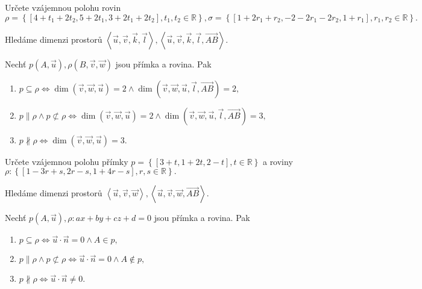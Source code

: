\begin{priklad}
Určete vzájemnou polohu rovin $\rho = \left \{ [4+t_1+2t_2,5+2t_1,3+2t_1+2t_2],t_1,t_2\in \mathbb R \right \} ,
\sigma = \left \{ [1+2r_1+r_2,-2-2r_1-2r_2,1+r_1],r_1,r_2\in \mathbb R \right \}. $
\end{priklad}

\begin{reseni}
Hledáme dimenzi prostorů $\left < \vec u, \vec v, \vec k, \vec l \right >, \left < \vec u, \vec v, \vec k, \vec l, \overrightarrow{AB} \right > .$
\end{reseni}

\begin{veta}
    Nechť $p(A,\vec u), \rho(B,\vec v, \vec w)$ jsou přímka a rovina. Pak
    \begin{enumerate}[$i.$]
    \item $p\subseteq \rho \iff \dim (\vec v, \vec w, \vec u) = 2 \land \dim (\vec v, \vec w, \vec u, \vec l, \overrightarrow{AB})=2,$
   	\item $p \parallel \rho \land p \not\subset \rho \iff \dim (\vec v, \vec w, \vec u) = 2 \land \dim (\vec v, \vec w, \vec u, \vec l, \overrightarrow{AB})=3,$
   	\item $p \nparallel \rho \iff \dim (\vec v, \vec w, \vec u) = 3$.
    \end{enumerate}
\end{veta}

\begin{priklad}
Určete vzájemnou polohu přímky $p=\left \{ [3+t,1+2t,2-t],t \in \mathbb R \right \} $
a roviny $\rho:\left \{ [1-3r+s,2r-s,1+4r-s],r,s\in \mathbb R \right \} .$
\end{priklad}

\begin{reseni}
Hledáme dimenzi prostorů $\left < \vec u, \vec v, \vec w \right >, \left < \vec u, \vec v, \vec w,  \overrightarrow{AB} \right > .$
\end{reseni}

\begin{veta}
    Nechť $p(A,\vec u), \rho: ax+by+cz+d=0$ jsou přímka a rovina. Pak
    \begin{enumerate}[$i.$]
    \item $p\subseteq \rho \iff \vec u \cdot \vec n = 0\land A\in p,$
   	\item $p \parallel \rho \land p \not\subset \rho \iff \vec u\cdot \vec n = 0\land A\notin p,$
   	\item $p \nparallel \rho \iff \vec u\cdot \vec n\ne 0$.
    \end{enumerate}
\end{veta}

